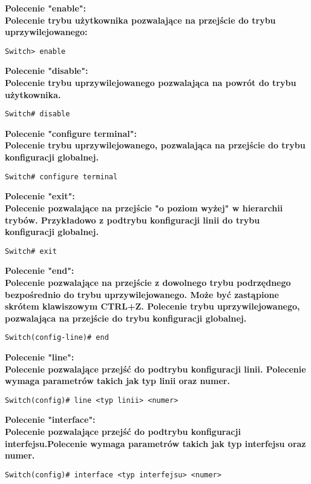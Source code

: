 \documentclass[a4paper,12pt]{article}
\newcommand{\h}[1]{\noindent \bf #1 \rm \\ \noindent}
\begin{document}
\h{Polecenie "enable":}
Polecenie trybu użytkownika pozwalające na przejście do trybu uprzywilejowanego:
\begin{lstlisting}
Switch> enable
\end{lstlisting}
\vspace{5mm}

\h{Polecenie "disable":}
Polecenie trybu uprzywilejowanego pozwalająca na powrót do trybu użytkownika.
\begin{lstlisting}
Switch# disable
\end{lstlisting}
\vspace{5mm}

\h{Polecenie "configure terminal":}
Polecenie trybu uprzywilejowanego, pozwalająca na przejście do trybu konfiguracji globalnej.
\begin{lstlisting}
Switch# configure terminal
\end{lstlisting}
\vspace{5mm}

\newpage
\h{Polecenie "exit":}
Polecenie pozwalające na przejście "o poziom wyżej" w hierarchii trybów. Przykładowo z podtrybu konfiguracji linii do trybu konfiguracji globalnej.
\begin{lstlisting}
Switch# exit
\end{lstlisting}
\vspace{5mm}

\h{Polecenie "end":}
Polecenie pozwalające na przejście z dowolnego trybu podrzędnego bezpośrednio do trybu uprzywilejowanego. Może być zastąpione skrótem klawiszowym CTRL+Z.
Polecenie trybu uprzywilejowanego, pozwalająca na przejście do trybu konfiguracji globalnej.
\begin{lstlisting}
Switch(config-line)# end
\end{lstlisting}
\vspace{5mm}

\h{Polecenie "line":}
Polecenie pozwalające przejść do podtrybu konfiguracji linii. Polecenie wymaga parametrów takich jak typ linii oraz numer. 
\begin{lstlisting}
Switch(config)# line <typ linii> <numer>
\end{lstlisting}
\vspace{5mm}

\h{Polecenie "interface":}
Polecenie pozwalające przejść do podtrybu konfiguracji interfejsu.Polecenie wymaga parametrów takich jak typ interfejsu oraz numer.
\begin{lstlisting}
Switch(config)# interface <typ interfejsu> <numer>
\end{lstlisting}
\vspace{5mm}
\end{document}
